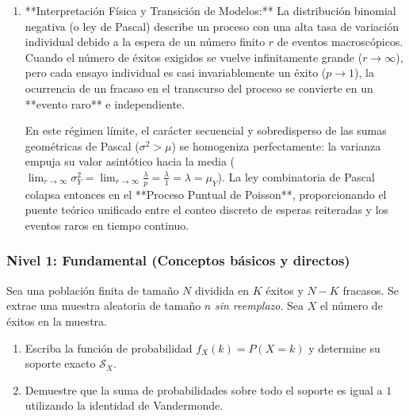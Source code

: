 \begin{solucion}
\begin{enumerate}
\begin{align*}
		\end{align*}
		Por otro lado, por el segundo límite notable de Euler, el factor exponencial acoplado converge a:
		\begin{align*}
			\lim_{r \to \infty} \left(1 - \dfrac{\lambda}{r}\right)^r = e^{-\lambda}.
		\end{align*}
		Multiplicando ambos límites puntuales convergentes, obtenemos de manera exacta la función de probabilidad de Poisson:
		\begin{align*}
			\lim_{r \to \infty} P(Y = y) = \dfrac{\lambda^y e^{-\lambda}}{y!}.
		\end{align*}
		\item **Interpretación Física y Transición de Modelos:**
		La distribución binomial negativa (o ley de Pascal) describe un proceso con una alta tasa de variación individual debido a la espera de un número finito $r$ de eventos macroscópicos. Cuando el número de éxitos exigidos se vuelve infinitamente grande ($r \to \infty$), pero cada ensayo individual es casi invariablemente un éxito ($p \to 1$), la ocurrencia de un fracaso en el transcurso del proceso se convierte en un **evento raro** e independiente.
		
		En este régimen límite, el carácter secuencial y sobredisperso de las sumas geométricas de Pascal ($\sigma^2 > \mu$) se homogeniza perfectamente: la varianza empuja su valor asintótico hacia la media ($\lim_{r \to \infty} \sigma_Y^2 = \lim_{r \to \infty} \frac{\lambda}{p} = \frac{\lambda}{1} = \lambda = \mu_Y$). La ley combinatoria de Pascal colapsa entonces en el **Proceso Puntual de Poisson**, proporcionando el puente teórico unificado entre el conteo discreto de esperas reiteradas y los eventos raros en tiempo continuo.
	\end{enumerate}
\end{solucion}


\subsubsection*{Nivel 1: Fundamental (Conceptos básicos y directos)}

\begin{problema}
	\label{prob:3.6.1}
	Sea una población finita de tamaño $N$ dividida en $K$ éxitos y $N-K$ fracasos. Se extrae una muestra aleatoria de tamaño $n$ \emph{sin reemplazo}. Sea $X$ el número de éxitos en la muestra.
	\begin{enumerate}
		\item Escriba la función de probabilidad $f_X(k) = P(X = k)$ y determine su soporte exacto $\mathcal{S}_X$.
		\item Demuestre que la suma de probabilidades sobre todo el soporte es igual a $1$ utilizando la identidad de Vandermonde.
	\end{enumerate}
\end{problema}

